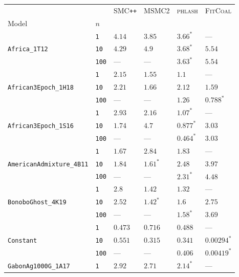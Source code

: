 \documentclass{article}
\begin{document}
\begin{footnotesize}
\begin{tabular}{llllll}
\toprule
 &  & \textsc{SMC}\texttt{{++}} & \textsc{MSMC2} & \textsc{phlash} & \textsc{FitCoal} \\
Model & $n$ &  &  &  &  \\
\midrule
\multirow[c]{3}{*}{\texttt{Africa\_1T12}} & \texttt{1} & $4.14$ & $3.85$ & $\mathbf{3.66}^*$ & --- \\
 & \texttt{10} & $4.29$ & $4.9$ & $\mathbf{3.68}^*$ & $5.54$ \\
 & \texttt{100} & --- & --- & $\mathbf{3.63}^*$ & $5.54$ \\
\cline{1-6}
\multirow[c]{3}{*}{\texttt{African3Epoch\_1H18}} & \texttt{1} & $2.15$ & $1.55$ & $\mathbf{1.1}$ & --- \\
 & \texttt{10} & $2.21$ & $1.66$ & $2.12$ & $\mathbf{1.59}$ \\
 & \texttt{100} & --- & --- & $1.26$ & $\mathbf{0.788}^*$ \\
\cline{1-6}
\multirow[c]{3}{*}{\texttt{African3Epoch\_1S16}} & \texttt{1} & $2.93$ & $2.16$ & $\mathbf{1.07}^*$ & --- \\
 & \texttt{10} & $1.74$ & $4.7$ & $\mathbf{0.877}^*$ & $3.03$ \\
 & \texttt{100} & --- & --- & $\mathbf{0.464}^*$ & $3.03$ \\
\cline{1-6}
\multirow[c]{3}{*}{\texttt{AmericanAdmixture\_4B11}} & \texttt{1} & $\mathbf{1.67}$ & $2.84$ & $1.83$ & --- \\
 & \texttt{10} & $1.84$ & $\mathbf{1.61}^*$ & $2.48$ & $3.97$ \\
 & \texttt{100} & --- & --- & $\mathbf{2.31}^*$ & $4.48$ \\
\cline{1-6}
\multirow[c]{3}{*}{\texttt{BonoboGhost\_4K19}} & \texttt{1} & $2.8$ & $1.42$ & $\mathbf{1.32}$ & --- \\
 & \texttt{10} & $2.52$ & $\mathbf{1.42}^*$ & $1.6$ & $2.75$ \\
 & \texttt{100} & --- & --- & $\mathbf{1.58}^*$ & $3.69$ \\
\cline{1-6}
\multirow[c]{3}{*}{\texttt{Constant}} & \texttt{1} & $\mathbf{0.473}$ & $0.716$ & $0.488$ & --- \\
 & \texttt{10} & $0.551$ & $0.315$ & $0.341$ & $\mathbf{0.00294}^*$ \\
 & \texttt{100} & --- & --- & $0.406$ & $\mathbf{0.00419}^*$ \\
\cline{1-6}
\multirow[c]{3}{*}{\texttt{GabonAg1000G\_1A17}} & \texttt{1} & $2.92$ & $2.71$ & $\mathbf{2.14}^*$ & --- \\

\end{tabular}
\end{footnotesize}
\end{document}
